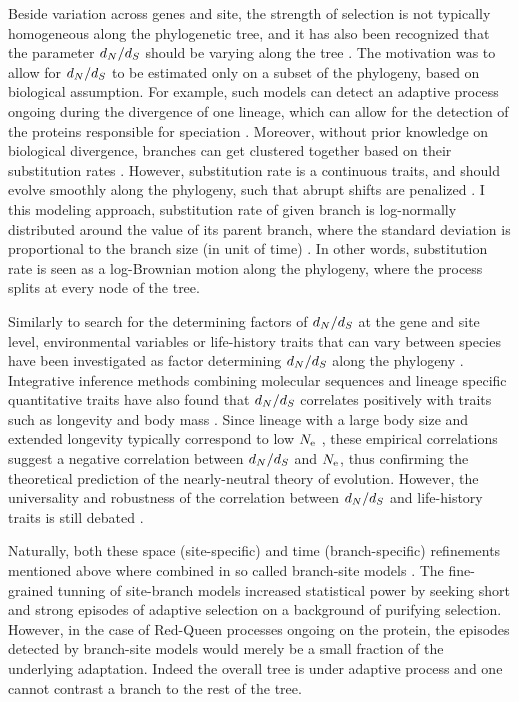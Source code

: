 Beside variation across genes and site, the strength of selection is not typically homogeneous along the phylogenetic tree, and it has also been recognized that the parameter $d_N / d_S$ should be varying along the tree \citep{Yang1998}.
The motivation was to allow for $d_N / d_S$ to be estimated only on a subset of the phylogeny, based on biological assumption.
For example, such models can detect an adaptive process ongoing during the divergence of one lineage, which can allow for the detection of the proteins responsible for speciation \citep{Yang2001, Zhang2004}.
Moreover, without prior knowledge on biological divergence, branches can get clustered together based on their substitution rates \citep{Dutheil2012a}.
However, substitution rate is a continuous traits, and should evolve smoothly along the phylogeny, such that abrupt shifts are penalized \citep{Huelsenbeck2003,Seo2004}.
I this modeling approach, substitution rate of given branch is log-normally distributed around the value of its parent branch, where the standard deviation is proportional to the branch size (in unit of time) \citep{Lartillot2011, Brevet2019}.
In other words, substitution rate is seen as a log-Brownian motion along the phylogeny, where the process splits at every node of the tree. 

Similarly to search for the determining factors of $d_N / d_S$ at the gene and site level, environmental variables or life-history traits that can vary between species have been investigated as factor determining $d_N / d_S$ along the phylogeny \citep{Felsenstein1985,Romiguier2014}.
Integrative inference methods combining molecular sequences and lineage specific quantitative traits have also found that $d_N / d_S$ correlates positively with traits such as longevity and body mass \citep{Lartillot2011, Figuet2017}.
Since lineage with a large body size and extended longevity typically correspond to low $N_{\textrm{e}}$ \citep{Romiguier2014}, these empirical correlations suggest a negative correlation between $d_N / d_S$ and $N_{\textrm{e}}$, thus confirming the theoretical prediction of the nearly-neutral theory of evolution.
However, the universality and robustness of the correlation between $d_N / d_S$ and life-history traits is still debated \citep{Nabholz2013, Lanfear2014, Figuet2016}.

Naturally, both these space (site-specific) and time (branch-specific) refinements mentioned above where combined in so called branch-site models \citep{Yang2002, Zhang2004, Pond2011}.
The fine-grained tunning of site-branch models increased statistical power by seeking short and strong episodes of adaptive selection on a background of purifying selection.
However, in the case of Red-Queen processes ongoing on the protein, the episodes detected by branch-site models would merely be a small fraction of the underlying adaptation.
Indeed the overall tree is under adaptive process and one cannot contrast a branch to the rest of the tree.

